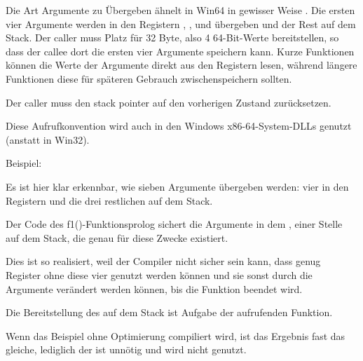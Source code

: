 Die Art Argumente zu Übergeben ähnelt in Win64 in gewisser Weise .
Die ersten vier Argumente werden in den Registern \RCX, \RDX,  und 
übergeben und der Rest auf dem Stack.
Der \gls{caller} muss Platz für 32 Byte, also 4 64-Bit-Werte bereitstellen, so
dass der \gls{callee} dort die ersten vier Argumente speichern kann.
Kurze Funktionen können die Werte der Argumente direkt aus den Registern lesen,
während längere Funktionen diese für späteren Gebrauch zwischenspeichern sollten.

Der \gls{caller} muss den \gls{stack pointer} auf den vorherigen Zustand zurücksetzen.

Diese Aufrufkonvention wird auch in den Windows x86-64-System-DLLs genutzt
(anstatt  in Win32).

Beispiel:



%



Es ist hier klar erkennbar, wie sieben Argumente übergeben werden: vier in den
Registern und die drei restlichen auf dem Stack.

Der Code des f1()-Funktionsprolog sichert die Argumente in dem ,
einer Stelle auf dem Stack, die genau für diese Zwecke existiert.

Dies ist so realisiert, weil der Compiler nicht sicher sein kann, dass genug Register
ohne diese vier genutzt werden können und sie sonst durch die Argumente verändert
werden können, bis die Funktion beendet wird.

Die Bereitstellung des  auf dem Stack ist Aufgabe der aufrufenden Funktion.

%


Wenn das Beispiel ohne Optimierung compiliert wird, ist das Ergebnis fast das gleiche,
lediglich der  ist unnötig und wird nicht genutzt.

\label{using_MOV_and_pack_of_LEA_to_load_values}

